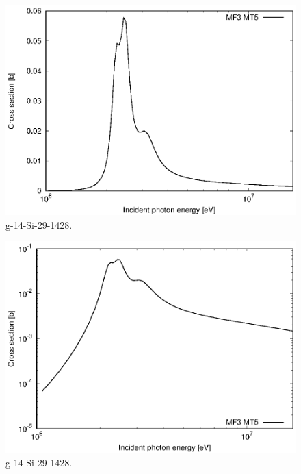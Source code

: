 \begin{figure}
 \includegraphics[width=\linewidth]{eps/g_14-Si-29_1428.eps}
  \caption{g-14-Si-29-1428.}
\end{figure}
\begin{figure}
 \includegraphics[width=\linewidth]{eps-log/g_14-Si-29_1428.eps}
 \caption{g-14-Si-29-1428.}
\end{figure}
\newpage \clearpage

